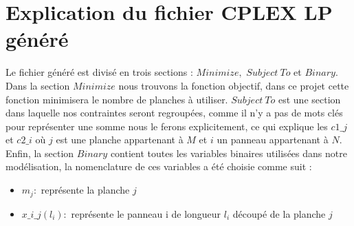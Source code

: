 \documentclass{article}[A4]
\begin{document}
\section{Explication du fichier CPLEX LP généré} 
Le fichier généré est divisé en trois sections : $Minimize,$ $Subject\ To$
et $Binary$. Dans la section $Minimize$ nous trouvons la fonction 
objectif, dans ce projet cette fonction minimisera le nombre de 
planches à utiliser. $Subject\ To$ est une section dans laquelle nos 
contraintes seront regroupées, comme il n'y a pas de mots clés pour 
représenter une somme nous le ferons explicitement, ce qui explique 
les \texttt{$c1\_j$} et \texttt{$c2\_i$} où $j$ est une planche 
appartenant à $M$ et $i$ un panneau appartenant à $N$. Enfin, la 
section $Binary$ contient toutes les variables binaires utilisées dans 
notre modélisation, la nomenclature de ces variables a été choisie 
comme suit : 

\begin{itemize}
	\item[] $m_j:$ représente la planche $j$
	\item[] \texttt{$x\_i\_j(l_i):$} représente le panneau i de longueur 
	$l_i$ découpé de la planche $j$
\end{itemize}  
\end{document}
